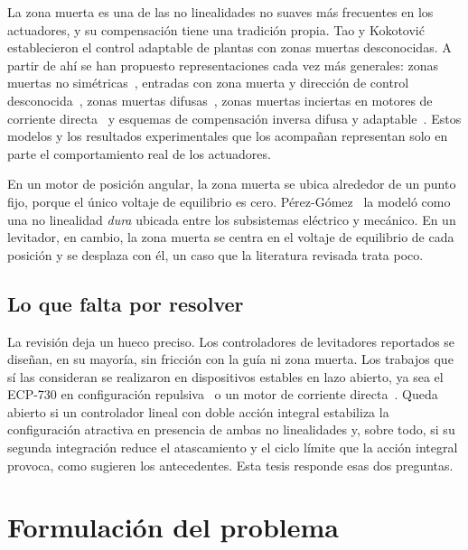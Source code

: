 La zona muerta es una de las no linealidades no suaves más frecuentes en los actuadores, y su compensación tiene una tradición propia. Tao y Kokotović~\cite{gang} establecieron el control adaptable de plantas con zonas muertas desconocidas. A partir de ahí se han propuesto representaciones cada vez más generales: zonas muertas no simétricas~\cite{salim}, entradas con zona muerta y dirección de control desconocida~\cite{huanqing}, zonas muertas difusas~\cite{zhi}, zonas muertas inciertas en motores de corriente directa~\cite{nizar} y esquemas de compensación inversa difusa y adaptable~\cite{guanyu}. Estos modelos y los resultados experimentales que los acompañan representan solo en parte el comportamiento real de los actuadores.

En un motor de posición angular, la zona muerta se ubica alrededor de un punto fijo, porque el único voltaje de equilibrio es cero. Pérez-Gómez~\cite{perez} la modeló como una no linealidad \emph{dura} ubicada entre los subsistemas eléctrico y mecánico. En un levitador, en cambio, la zona muerta se centra en el voltaje de equilibrio de cada posición y se desplaza con él, un caso que la literatura revisada trata poco.

\subsection{Lo que falta por resolver}

La revisión deja un hueco preciso. Los controladores de levitadores reportados se diseñan, en su mayoría, sin fricción con la guía ni zona muerta. Los trabajos que sí las consideran se realizaron en dispositivos estables en lazo abierto, ya sea el ECP-730 en configuración repulsiva~\cite{diana_tesis,alcantara} o un motor de corriente directa~\cite{perez}. Queda abierto si un controlador lineal con doble acción integral estabiliza la configuración atractiva en presencia de ambas no linealidades y, sobre todo, si su segunda integración reduce el atascamiento y el ciclo límite que la acción integral provoca, como sugieren los antecedentes. Esta tesis responde esas dos preguntas.

\section{Formulación del problema}

